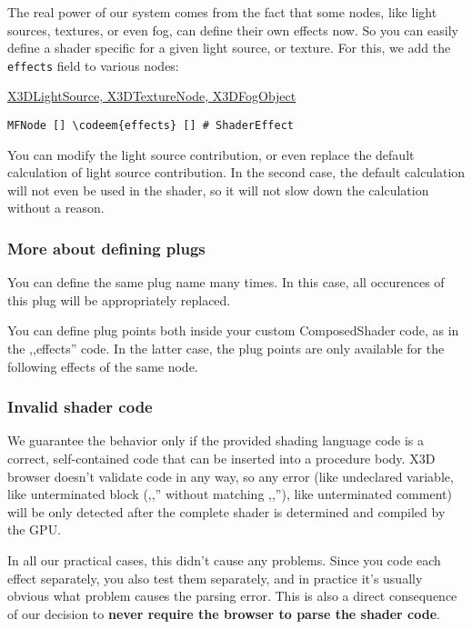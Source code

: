 \documentclass{acmsiggraph}                     %
\newenvironment{mycode}
{\begin{mycodecore}}
{\end{mycodecore}
\vspace{-0.1in}}
\newcommand*{\codeem}[1]{\textbf{#1}}
\begin{document}
The real power of our system comes from the fact that some nodes,
like light sources, textures, or even fog, can define their own effects
now. So you can easily define a shader specific for a given light source,
or texture. For this, we add the \texttt{effects} field to various nodes:

\begin{mycode}
\underline{X3DLightSource, X3DTextureNode, X3DFogObject}
\begin{Verbatim}[commandchars=\\\{\}]
MFNode [] \codeem{effects} [] # ShaderEffect
\end{Verbatim}
\end{mycode}


You can modify the light source contribution, or even replace the default
calculation of light source contribution. In the second case,
the default calculation will not even be used in the shader,
so it will not slow down the calculation without a reason.

\subsubsection{More about defining plugs}

You can define the same plug name many times. In this case,
all occurences of this plug will be appropriately replaced.

You can define plug points both inside your custom ComposedShader code,
as in the ,,effects'' code. In the latter case, the plug points
are only available for the following effects of the same node.

\subsubsection{Invalid shader code}

We guarantee the behavior only if the provided shading language code
is a correct, self-contained code that can be inserted into a procedure body.
X3D browser doesn't validate code in any way, so any error (like undeclared
variable, like unterminated block (,,{'' without matching ,,}''),
like unterminated comment) will be only detected after the complete shader
is determined and compiled by the GPU.

In all our practical cases, this didn't cause any problems.
Since you code each effect separately, you also test them separately,
and in practice it's usually obvious what problem causes the parsing error.
This is also a direct consequence of our decision to \textbf{never require
the browser to parse the shader code}.
\end{document}
